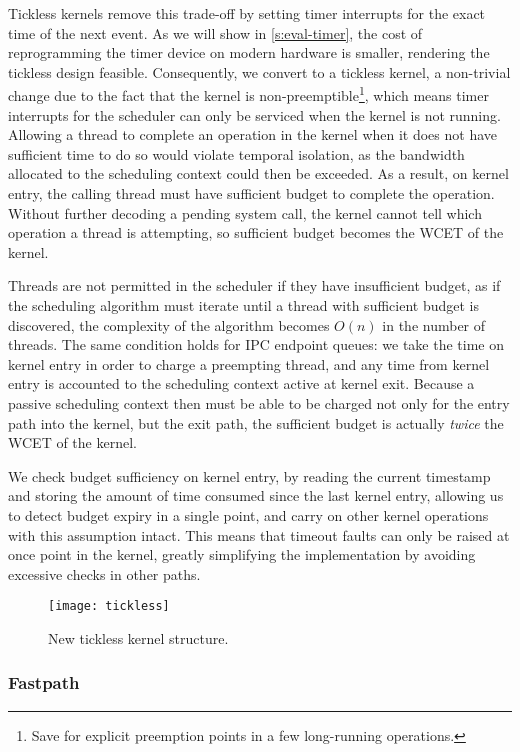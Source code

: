 Tickless kernels remove this trade-off by setting timer interrupts for the exact time of the next
event. As we will show in \cref{s:eval-timer}, the cost of reprogramming the timer device on modern
hardware is smaller, rendering the tickless design feasible. Consequently, we convert \selfour
to a tickless kernel, a non-trivial change due to the fact that the kernel is
non-preemptible\footnote{Save for
explicit preemption points in a few long-running operations.}, which means timer interrupts for the
scheduler can only be serviced when the kernel is not running. Allowing a thread to complete an
operation in the kernel when it does not have sufficient time to do so would violate temporal
isolation, as the bandwidth allocated to the scheduling context could then be exceeded. As a result,  
on kernel entry, the calling thread must have sufficient budget to complete the operation. Without
further decoding a pending system call, the kernel cannot tell which operation a thread is
attempting, so sufficient budget becomes the \gls{WCET} of the kernel.

Threads are not permitted in the scheduler if they have insufficient budget, as if the scheduling
algorithm must iterate until a thread with sufficient budget is discovered, the complexity of the
algorithm becomes $O(n)$ in the number of threads. The same condition holds for IPC endpoint queues:
we take the time on kernel entry in order to charge a preempting thread, and any time from kernel
entry is accounted to the scheduling context active at kernel exit. Because a passive scheduling context
then must be able to be charged not only for the entry path into the kernel, but the exit path, the
sufficient budget is actually \emph{twice} the \gls{WCET} of the kernel.

We check budget sufficiency on kernel entry, by reading the current timestamp and storing 
the amount of time consumed since the last kernel entry, allowing us to detect budget expiry in a single 
point, and carry on other kernel operations with this assumption intact. This means that timeout 
faults can only be raised at once point in the kernel, greatly simplifying the implementation by
avoiding excessive checks in other paths. 

\begin{figure}
    \centering 
    \texttt{[image: tickless]}
    \caption{New tickless kernel structure.}
    \label{figure:tickless}
\end{figure}


\subsubsection{Fastpath}
\label{p:impl-fastpath}

